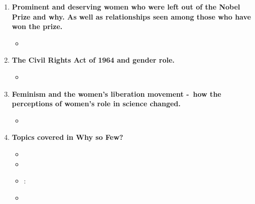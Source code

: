 \documentclass[12pt,a4paper]{article}
\begin{document}
\begin{enumerate}
\begin{itemize}
    \end{itemize}
    \item {} \textbf{Prominent and deserving women who were left out of the Nobel Prize and why. As well as relationships seen among those who have won the prize.}
    \begin{itemize}
      \item
    \end{itemize}
    \item {} \textbf{The Civil Rights Act of 1964 and gender role.}
    \begin{itemize}
      \item 
    \end{itemize}
    \item {} \textbf{Feminism and the women’s liberation movement -\ how the perceptions of women's role in science changed.}
    \begin{itemize}
      \item
    \end{itemize}
    \item \textbf{Topics covered in Why so Few?}
    \begin{itemize} 
      \item {}%
      \item {}%
      \item {}:%
      \item {}

\end{itemize}
\end{enumerate}
\end{document}
